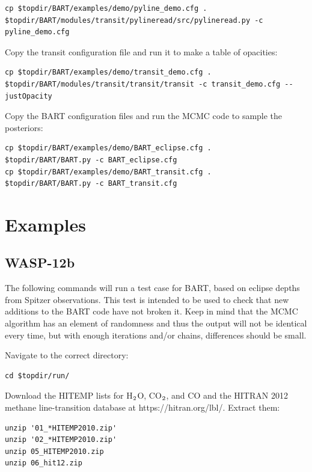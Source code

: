 \documentclass[letterpaper, 12pt]{article}
\begin{document}
{\fontsize{9.8}{1em}\selectfont
\begin{verbatim}
cp $topdir/BART/examples/demo/pyline_demo.cfg .  
$topdir/BART/modules/transit/pylineread/src/pylineread.py -c pyline_demo.cfg
\end{verbatim}}

\noindent Copy the transit configuration file and run it to make a
table of opacities:

{\fontsize{9.8}{1em}\selectfont
\begin{verbatim}
cp $topdir/BART/examples/demo/transit_demo.cfg .
$topdir/BART/modules/transit/transit/transit -c transit_demo.cfg --justOpacity
\end{verbatim}}

\noindent Copy the BART configuration files and run the MCMC code to sample the
posteriors:

{\fontsize{9.8}{1em}\selectfont
\begin{verbatim}
cp $topdir/BART/examples/demo/BART_eclipse.cfg .
$topdir/BART/BART.py -c BART_eclipse.cfg
cp $topdir/BART/examples/demo/BART_transit.cfg .
$topdir/BART/BART.py -c BART_transit.cfg
\end{verbatim}}

\section{Examples}
\subsection{WASP-12b}
The following commands will run a test case for BART, based on eclipse
depths from Spitzer observations. This test is intended to be used to
check that new additions to the BART code have not broken it. Keep in
mind that the MCMC algorithm has an element of randomness and thus the
output will not be identical every time, but with enough iterations
and/or chains, differences should be small.
\newline

\noindent Navigate to the correct directory:
{\fontsize{9.8}{1em}\selectfont
\begin{verbatim}
cd $topdir/run/
\end{verbatim}}

\noindent Download the HITEMP lists for H$\sb{2}$O, CO$\sb{2}$, and CO and the HITRAN 2012 methane line-transition database at https://hitran.org/lbl/. Extract them:

{\fontsize{9.8}{1em}\selectfont
\begin{lstlisting}[breaklines]
unzip '01_*HITEMP2010.zip'
unzip '02_*HITEMP2010.zip'
unzip 05_HITEMP2010.zip
unzip 06_hit12.zip
\end{lstlisting}}
\end{document}
